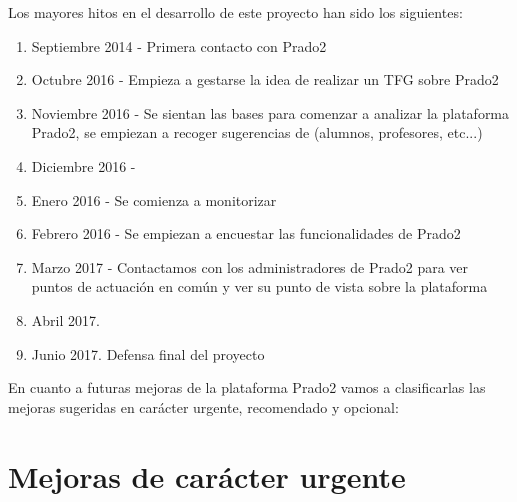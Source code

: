 Los mayores hitos en el desarrollo de este proyecto han sido los siguientes:

\begin{enumerate}
	\item Septiembre 2014 - Primera contacto con Prado2


\item Octubre 2016 - Empieza a gestarse la idea de realizar un TFG sobre Prado2

\item Noviembre 2016 - Se sientan las bases para comenzar a analizar la plataforma Prado2, se empiezan a recoger sugerencias de (alumnos, profesores, etc...)

\item Diciembre 2016 - 

\item Enero 2016 - Se comienza a monitorizar

\item Febrero 2016 - Se empiezan a encuestar las funcionalidades de Prado2

\item Marzo 2017 - Contactamos con los administradores de Prado2 para ver puntos de actuación en común y ver su punto de vista sobre la plataforma

\item Abril 2017. 

\item Junio 2017. Defensa final del proyecto

\end{enumerate}




\newpage
En cuanto a futuras mejoras de la plataforma Prado2 vamos a clasificarlas las mejoras sugeridas en carácter urgente, recomendado y opcional:

\section{Mejoras de carácter urgente}

